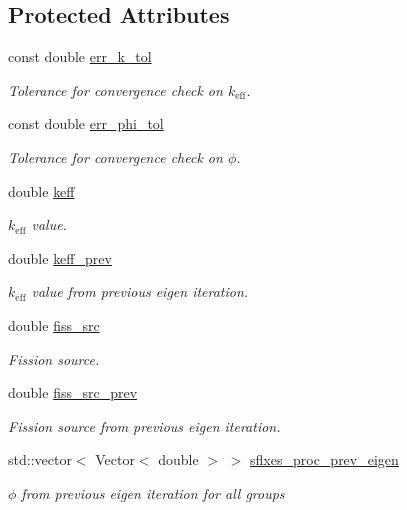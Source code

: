 \subsection*{Protected Attributes}
\begin{DoxyCompactItemize}
\item 
const double \hyperlink{class_eigen_base_af082247a6dec17c46fd664a780d9a765}{err\+\_\+k\+\_\+tol}
\begin{DoxyCompactList}\small\item\em Tolerance for convergence check on $k_\mathrm{eff}$. \end{DoxyCompactList}\item 
const double \hyperlink{class_eigen_base_acc8e2b79484a329d746a55ba656feead}{err\+\_\+phi\+\_\+tol}
\begin{DoxyCompactList}\small\item\em Tolerance for convergence check on $\phi$. \end{DoxyCompactList}\item 
double \hyperlink{class_eigen_base_a9373e0bd7462b70829d88b82cb66ac10}{keff}
\begin{DoxyCompactList}\small\item\em $k_\mathrm{eff}$ value. \end{DoxyCompactList}\item 
double \hyperlink{class_eigen_base_a1499f0cb877e5dff2013328e06a29b4a}{keff\+\_\+prev}
\begin{DoxyCompactList}\small\item\em $k_\mathrm{eff}$ value from previous eigen iteration. \end{DoxyCompactList}\item 
double \hyperlink{class_eigen_base_a6fa0753510038439c30de5c1832e4ebc}{fiss\+\_\+src}
\begin{DoxyCompactList}\small\item\em Fission source. \end{DoxyCompactList}\item 
double \hyperlink{class_eigen_base_aa324e40bd20edd51659416da3220d295}{fiss\+\_\+src\+\_\+prev}
\begin{DoxyCompactList}\small\item\em Fission source from previous eigen iteration. \end{DoxyCompactList}\item 
std\+::vector$<$ Vector$<$ double $>$ $>$ \hyperlink{class_eigen_base_aec9885df50ea40a18fd5708061139843}{sflxes\+\_\+proc\+\_\+prev\+\_\+eigen}
\begin{DoxyCompactList}\small\item\em $\phi$ from previous eigen iteration for all groups \end{DoxyCompactList}\end{DoxyCompactItemize}


